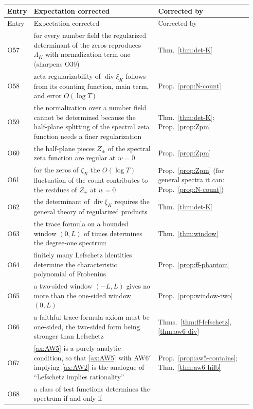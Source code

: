 \documentclass[11pt]{amsart}
\theoremstyle{plain}
\theoremstyle{definition}
\theoremstyle{remark}
\numberwithin{equation}{section}
\DeclareMathOperator{\divisor}{div}
\begin{document}
\begin{longtable}{@{}l>{\raggedright\arraybackslash}p{}
>{\raggedright\arraybackslash}p{}@{}}
\toprule
Entry & Expectation corrected & Corrected by\\
\midrule
\endfirsthead
\toprule
Entry & Expectation corrected & Corrected by\\
\midrule
\endhead
\bottomrule
\endfoot
O57 & for every number field the regularized determinant of the zeros
  reproduces $\Lambda_K$ with normalization term one (sharpens O39) &
  Thm.~\ref{thm:det-K}\\
O58 & zeta-regularizability of $\divisor\xi_K$ follows from its
  counting function, main term, and error $O(\log T)$ &
  Prop.~\ref{prop:N-count}\\
O59 & the normalization over a number field cannot be determined because
  the half-plane splitting of the spectral zeta function needs a finer
  regularization & Thm.~\ref{thm:det-K}; Prop.~\ref{prop:Zpm}\\
O60 & the half-plane pieces $Z_\pm$ of the spectral zeta function are
  regular at $w=0$ & Prop.~\ref{prop:Zpm}\\
O61 & for the zeros of $\zeta_K$ the $O(\log T)$ fluctuation of the count
  contributes to the residues of $Z_\pm$ at $w=0$ &
  Prop.~\ref{prop:Zpm} (for general spectra it can:
  Prop.~\ref{prop:N-count})\\
O62 & the determinant of $\divisor\xi_K$ requires the general theory of
  regularized products & Thm.~\ref{thm:det-K}\\
O63 & the trace formula on a bounded window $(0,L)$ of times determines
  the degree-one spectrum & Thm.~\ref{thm:window}\\
O64 & finitely many Lefschetz identities determine the characteristic
  polynomial of Frobenius & Prop.~\ref{prop:ff-phantom}\\
O65 & a two-sided window $(-L,L)$ gives no more than the one-sided
  window $(0,L)$ & Prop.~\ref{prop:window-two}\\
O66 & a faithful trace-formula axiom must be one-sided, the two-sided
  form being stronger than Lefschetz & Thms.~\ref{thm:ff-lefschetz},
  \ref{thm:aw6-div}\\
O67 & \ref{ax:AW5} is a purely analytic condition, so that
  \ref{ax:AW5} with AW6$'$ implying \ref{ax:AW2} is the analogue of
  ``Lefschetz implies rationality'' & Prop.~\ref{prop:aw5-contains};
  Thm.~\ref{thm:aw6-hilb}\\
O68 & a class of test functions determines the spectrum if and only if

\end{longtable}
\end{document}
